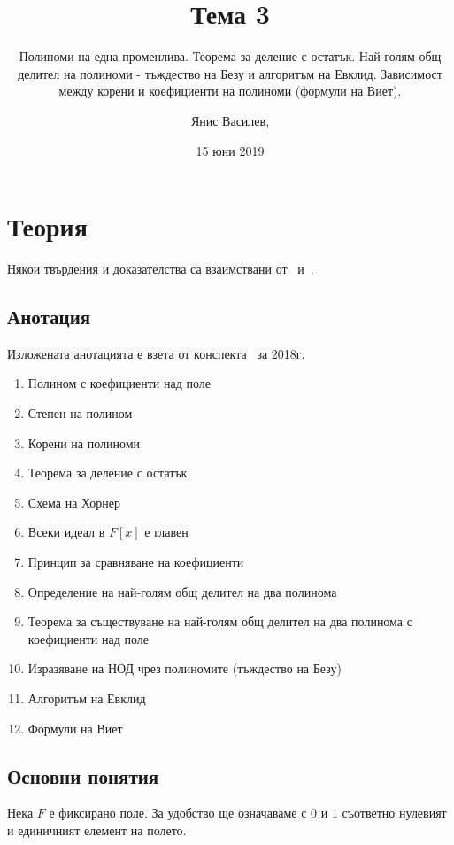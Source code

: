 \documentclass[numbers=endperiod, bibliography=totocnumbered]{scrartcl}
\title{Тема 3}
\subtitle{Полиноми на една променлива. Теорема за деление с остатък. Най-голям общ делител на полиноми - тъждество на Безу и алгоритъм на Евклид. Зависимост между корени и коефициенти на полиноми (формули на Виет).}
\author{Янис Василев, \Email{ianis@ivasilev.net}}
\date{15 юни 2019}
\begin{document}
\maketitle

\section{Теория}

Някои твърдения и доказателства са взаимствани от~\cite{Knapp} и~\cite{RoyachkiNotes}.

\subsection{Анотация}

Изложената анотацията е взета от конспекта~\cite{Syllabus} за 2018г.

\begin{enumerate}
  \item Полином с коефициенти над поле
  \item Степен на полином
  \item Корени на полиноми
  \item Теорема за деление с остатък
  \item Схема на Хорнер
  \item Всеки идеал в \( F[x] \) е главен
  \item Принцип за сравняване на коефициенти
  \item Определение на най-голям общ делител на два полинома
  \item Теорема за съществуване на най-голям общ делител на два полинома с коефициенти над поле
  \item Изразяване на НОД чрез полиномите (тъждество на Безу)
  \item Алгоритъм на Евклид
  \item Формули на Виет
\end{enumerate}

\subsection{Основни понятия}

Нека \( F \) е фиксирано поле. За удобство ще означаваме с \( 0 \) и \( 1 \) съответно нулевият и единичният елемент на полето.
\end{document}
